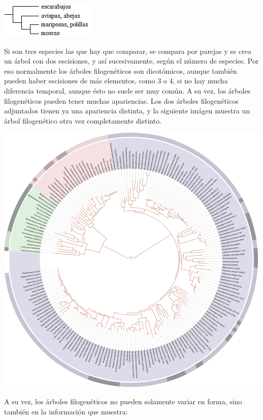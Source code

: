 \begin{center}
\includegraphics[scale=.7]{images/Cladogram-example1-es.png}
\end{center}

Si son tres especies las que hay que comparar, se compara por parejas
y se crea un árbol con dos escisiones, y así sucesivamente, según el
número de especies. Por eso normalmente los árboles filogenéticos son
dicotómicos, aunque también pueden haber escisiones de más elementos,
como 3 o 4, si no hay mucha diferencia temporal, aunque ésto no suele
ser muy común. A su vez, los árboles filogenéticos pueden tener muchas
apariencias. Los dos árboles filogenéticos adjuntados tienen ya una
apariencia distinta, y la siguiente imágen muestra un árbol
filogenético otra vez completamente distinto.

\begin{center}
\includegraphics[scale=.7]{images/Tree_of_life.png}
\end{center}

A su vez, los árboles filogenéticos no pueden solamente variar en
forma, sino también en la información que muestra:


